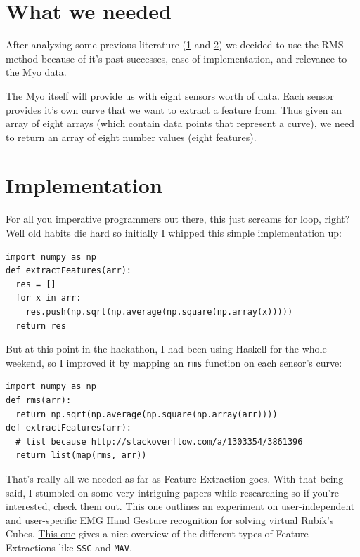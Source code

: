 \documentclass[12pt]{article}
\begin{document}
\section{What we needed}\label{what-we-needed}

After analyzing some previous literature
(\href{http://wiki.epfl.ch/edicpublic/documents/Candidacy\%20exam/Zhang\%20X.\%20et\%20al.\%20(2011)\%20-\%20A\%20Framework\%20for\%20Hand\%20Gesture\%20Recognition\%20Based\%20on\%20Accelerometer\%20and\%20EMG\%20Sensors.pdf}{1}
and \href{http://rspublication.com/ijca/april13/3.pdf}{2}) we decided to
use the RMS method because of it's past successes, ease of
implementation, and relevance to the Myo data.

The Myo itself will provide us with eight sensors worth of data. Each
sensor provides it's own curve that we want to extract a feature from.
Thus given an array of eight arrays (which contain data points that
represent a curve), we need to return an array of eight number values
(eight features).

\section{Implementation}\label{implementation}

For all you imperative programmers out there, this just screams for
loop, right? Well old habits die hard so initially I whipped this simple
implementation up:

\begin{lstlisting} 
import numpy as np 
def extractFeatures(arr):
  res = [] 
  for x in arr:
    res.push(np.sqrt(np.average(np.square(np.array(x))))) 
  return res
\end{lstlisting}

But at this point in the hackathon, I had been using Haskell for the
whole weekend, so I improved it by mapping an \texttt{rms} function on
each sensor's curve:

\begin{lstlisting}  
import numpy as np 
def rms(arr): 
  return np.sqrt(np.average(np.square(np.array(arr)))) 
def extractFeatures(arr):
  # list because http://stackoverflow.com/a/1303354/3861396 
  return list(map(rms, arr)) 
\end{lstlisting} 

That's really all we needed as far as Feature Extraction goes. With that
being said, I stumbled on some very intriguing papers while researching
so if you're interested, check them out.
\href{http://wiki.epfl.ch/edicpublic/documents/Candidacy\%20exam/Zhang\%20X.\%20et\%20al.\%20(2011)\%20-\%20A\%20Framework\%20for\%20Hand\%20Gesture\%20Recognition\%20Based\%20on\%20Accelerometer\%20and\%20EMG\%20Sensors.pdf}{This
one} outlines an experiment on user-independent and user-specific EMG
Hand Gesture recognition for solving virtual Rubik's Cubes.
\href{http://rspublication.com/ijca/april13/3.pdf}{This one} gives a
nice overview of the different types of Feature Extractions like
\texttt{SSC} and \texttt{MAV}.
\end{document}
